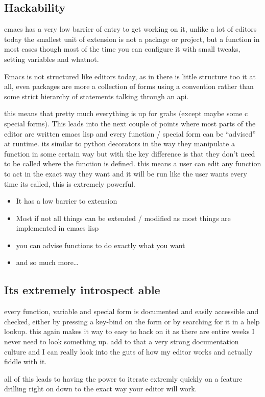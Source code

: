 \documentclass[a4paper]{article}
\begin{document}
\subsection*{Hackability}
\label{sec:org49afff5}
\begin{notes}
emacs has a very low barrier of entry to get working on it, unlike a lot of
editors today the smallest unit of extension is not a package or project, but a
function in most cases though most of the time you can configure it with
small tweaks, setting variables and whatnot.

Emacs is not structured like editors today, as in there is little structure too
it at all, even packages are more a collection of forms using a convention rather than
some strict hierarchy of statements talking through an api.

this means that pretty much everything is up for grabs (except maybe some c
special forms). This leads into the next couple of points where most parts of
the editor are written emacs lisp and every function / special form can be
``advised'' at runtime. its similar to python decorators in the way they
manipulate a function in some certain way but with the key
difference is that they don't need to be called where  the function is defined. this
means a user can edit any function to act in the exact way they want and it will
be run like the user wants every time its called, this is extremely powerful.
\end{notes}

\begin{itemize}
\item It has a low barrier to extension
\item Most if not all things can be extended / modified as most things are
implemented in emacs lisp
\item you can advise functions to do exactly what you want
\item and so much more\ldots{}
\end{itemize}

\subsection*{Its extremely introspect able}
\label{sec:org3a1f7f2}
\begin{notes}
every function, variable and special form is documented and easily accessible and
checked, either by pressing a key-bind on the form or by searching for it in a
help lookup. this again makes it way to easy to hack on it as there are entire
weeks I never need to look something up. add to that a very strong documentation
culture and I can really look into the guts of how my editor works and actually
fiddle with it.

all of this leads to having the power to iterate extremly quickly on a feature
drilling right on down to the exact way your editor will work.
\end{notes}
\end{document}
